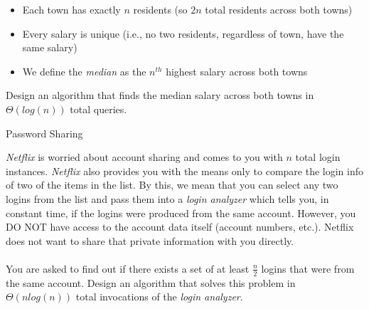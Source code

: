 \documentclass[10pt]{article}
\begin{document}
\begin{itemize}
\item Each town has exactly $n$ residents (so $2n$ total residents across both towns)
\item Every salary is unique (i.e., no two residents, regardless of town, have the same salary) 
\item We define the \emph{median} as the $n^{th}$ highest salary across both towns
\end{itemize}

Design an algorithm that finds the median salary across both towns in $\Theta(log(n))$ total queries.

\solution{
}



\begin{problem} Password Sharing \end{problem}

\emph{Netflix} is worried about account sharing and comes to you with $n$ total login instances. \emph{Netflix} also provides you with the means only to compare the login info of two of the items in the list. By this, we mean that you can select any two logins from the list and pass them into a \emph{login analyzer} which tells you, in constant time, if the logins were produced from the same account. However, you DO NOT have access to the account data itself (account numbers, etc.). Netflix does not want to share that private information with you directly.\\
\\
You are asked to find out if there exists a set of at least $\frac{n}{2}$ logins that were from the same account. Design an algorithm that solves this problem in $\Theta(nlog(n))$ total invocations of the \emph{login analyzer}.


\solution{
}







\end{document}
